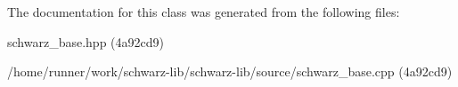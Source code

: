 The documentation for this class was generated from the following files\+:\begin{DoxyCompactItemize}
\item 
schwarz\+\_\+base.\+hpp (4a92cd9)\item 
/home/runner/work/schwarz-\/lib/schwarz-\/lib/source/schwarz\+\_\+base.\+cpp (4a92cd9)\end{DoxyCompactItemize}
